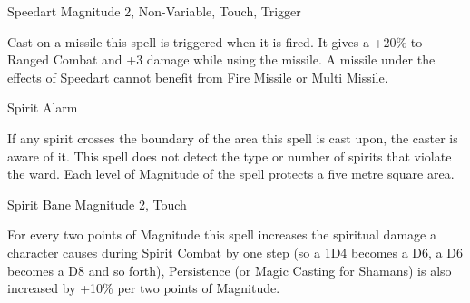 \begin{rpg-spell}
{Speedart}
{Magnitude 2, Non-Variable, Touch, Trigger}

Cast on a missile this spell is triggered when it is fired. It gives a +20\% to Ranged Combat and +3 damage while using the missile. A missile under the effects of Speedart cannot benefit from Fire Missile or Multi Missile.
\end{rpg-spell}


\begin{rpg-spell}
{Spirit Alarm}
{}

If any spirit crosses the boundary of the area this spell is cast upon, the caster is aware of it. This spell does not detect the type or number of spirits that violate the ward. Each level of Magnitude of the spell protects a five metre square area.
\end{rpg-spell}


\begin{rpg-spell}
{Spirit Bane}
{Magnitude 2, Touch}

For every two points of Magnitude this spell increases the spiritual damage a character causes during Spirit Combat by one step (so a 1D4 becomes a D6, a D6 becomes a D8 and so forth), Persistence (or Magic Casting for Shamans) is also increased by +10\% per two points of Magnitude.
\end{rpg-spell}


